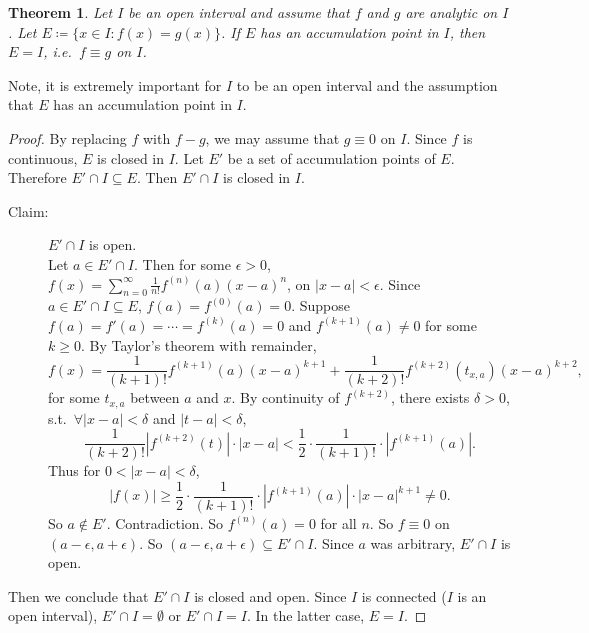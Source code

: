 \documentclass[12pt]{article}
\theoremstyle{plain}
\newtheorem{thm}{Theorem}
\theoremstyle{definition}
\begin{document}
\begin{thm}
    Let $I$ be an open interval and assume that $f$ and $g$ are analytic on $I$.
    Let $E\coloneqq \{ x\in I: f(x) = g(x) \}$.
    If $E$ has an accumulation point in $I$, then $E=I$, i.e.\ $f\equiv g$ on $I$.
\end{thm}
    Note, it is extremely important for $I$ to be an open interval and the assumption that $E$ has an accumulation point in $I$.
\begin{proof}
    By replacing $f$ with $f-g$, we may assume that $g\equiv 0$ on $I$.
    Since $f$ is continuous, $E$ is closed in $I$.
    Let $E'$ be a set of accumulation points of $E$.
    Therefore $E'\cap I\subseteq E$.
    Then $E'\cap I$ is closed in $I$.
    \begin{description}
        \item[Claim:] $E'\cap I$ is open.\\
            Let $a\in E'\cap I$.
            Then for some $\epsilon>0$, $f(x) = \sum_{n=0}^\infty \frac{1}{n!}f^{(n)}(a)(x-a)^n$, on $|x-a|<\epsilon$.
            Since $a\in E'\cap I\subseteq E$, $f(a)=f^{(0)}(a)=0$.
            Suppose $f(a)=f'(a)=\cdots = f^{(k)}(a) = 0$ and $f^{(k+1)}(a)\neq 0$ for some $k\geq 0$.
            By Taylor's theorem with remainder,
            \[f(x) = \frac{1}{(k+1)!}f^{(k+1)}(a)(x-a)^{k+1} + \frac{1}{(k+2)!}f^{(k+2)}(t_{x,a})(x-a)^{k+2},\]
            for some $t_{x,a}$ between $a$ and $x$.
            By continuity of $f^{(k+2)}$, there exists $\delta>0$, s.t.\ $\forall |x-a|<\delta$ and $|t-a|<\delta$, 
            \[ \frac{1}{(k+2)!}\left| f^{(k+2)}(t)\right|\cdot |x-a| < \frac{1}{2} \cdot \frac{1}{(k+1)!}\cdot \left|f^{(k+1)}(a)\right|.\]
            Thus for $0<|x-a|<\delta$,
            \[ |f(x)|\geq \frac{1}{2}\cdot \frac{1}{(k+1)!} \cdot \left| f^{(k+1)}(a)\right|\cdot |x-a|^{k+1}\neq 0.\]
            So $a\notin E'$. Contradiction.
            So $f^{(n)}(a) = 0$ for all $n$.
            So $f\equiv 0$ on $(a-\epsilon, a+\epsilon)$.
            So $(a-\epsilon,a+\epsilon)\subseteq E'\cap I$.
            Since $a$ was arbitrary, $E'\cap I$ is open.
    \end{description}
    Then we conclude that $E'\cap I$ is closed and open.
    Since $I$ is connected ($I$ is an open interval), $E'\cap I=\emptyset$ or $E'\cap I = I$.
    In the latter case, $E=I$.
\end{proof}
\end{document}

